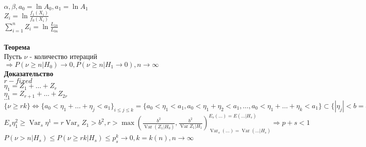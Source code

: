 \documentclass{article}
\newcommand\0{\mathbb{0}}
\DeclareMathOperator{\Var}{Var}
\newcommand\1{\mathbb{1}}
\renewcommand{\bf}{\textbf}
\newcommand{\Rto}{\Rightarrow}
\newcommand{\LRto}{\Leftrightarrow}
\begin{document}
$\alpha, \beta, a_0 = \ln{A_0}, a_1 = \ln{A_1}$\\
$Z_i = \ln{\frac{f_1(X_i)}{f_0(X_i)}}$\\
$\displaystyle\sum_{i = 1}^{n} Z_i = \ln{\frac{L_{1n}}{L_{0n}}}$\\
\\
\bf{Теорема}\\
Пусть $\nu$ - количество итераций\\
$\Rto P(\nu \geq n | H_0) \to 0, P(\nu \geq n | H_1 \to 0), n \to \infty$\\
\bf{Доказательство}\\
$r - fixed$\\
$\eta_1 = Z_1 + \dots + Z_r$\\
$\eta_1 = Z_{r + 1} + \dots + Z_{2r}$\\
$\dots$
$\{\nu \geq rk\} \LRto \{a_0 < \eta_1 + \dots + \eta_j < a_1\}_{i \leq j \leq k} = \{a_0 < \eta_1 < a_1, a_0 < \eta_1 + \eta_2 < a_1, \dots, a_0 < \eta_1 + \dots + \eta_k < a_1\} \subset \{|\eta_j| < b = a_i - a_0\}_{1 \leq j \leq k} \Rto P(\nu \geq rk | H_s) \leq P_{1 \leq j \leq k}(|\eta_j| < b | H_s) = P_{1 \leq j \leq k}(\nu_j^2 < b^2 | H_s) = P^k(\eta_1^2 < b^2 | H_s) = p_s^k$\\
$E_s\eta_1^2 \geq \Var_s\eta^1 = r\Var_s Z_1 > b^2, r > \max{(\frac{b^2}{\Var(Z_1 | H_0)}, \frac{b^2}{\Var{Z_1 | H_1}})_{\Var_s(\dots) = \Var(\dots | H_s)}^{E_s(\dots) = E(\dots | H_s)}} \Rto p+s < 1$\\
$P(\nu > n | H_s) \leq P(\nu \geq rk | H_s) \leq p_s^k \to 0, k = k(n), n \to \infty$\\
\end{document}
